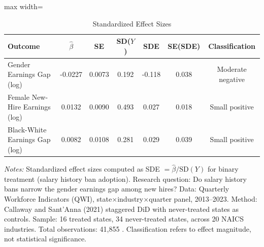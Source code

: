 \begin{table}[htbp]
\centering
\caption{Standardized Effect Sizes}
\label{tab:sde}
\begin{adjustbox}{max width=\textwidth}
\begin{threeparttable}
\begin{tabular}{lcccccc}
\toprule
Outcome & $\hat{\beta}$ & SE & SD($Y$) & SDE & SE(SDE) & Classification \\
\midrule
Gender Earnings Gap (log) & -0.0227 & 0.0073 & 0.192 & -0.118 & 0.038 & Moderate negative \\
Female New-Hire Earnings (log) & 0.0132 & 0.0090 & 0.493 & 0.027 & 0.018 & Small positive \\
Black-White Earnings Gap (log) & 0.0082 & 0.0108 & 0.281 & 0.029 & 0.039 & Small positive \\
\bottomrule
\end{tabular}
\begin{tablenotes}[flushleft]
\small
\item \textit{Notes:} Standardized effect sizes computed as SDE $= \hat{\beta} / \text{SD}(Y)$
for binary treatment (salary history ban adoption).
Research question: Do salary history bans narrow the gender earnings gap among new hires?
Data: Quarterly Workforce Indicators (QWI), state$\times$industry$\times$quarter panel, 2013--2023.
Method: Callaway and Sant'Anna (2021) staggered DiD with never-treated states as controls.
Sample: 16 treated states, 34 never-treated states, across 20 NAICS industries.
Total observations: 
41,855
.
Classification refers to effect magnitude, not statistical significance.
\end{tablenotes}
\end{threeparttable}
\end{adjustbox}
\end{table}
